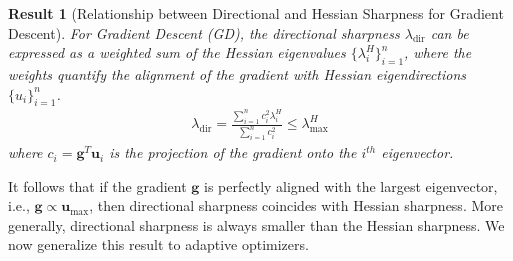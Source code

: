 \documentclass[]{fairmeta}
\theoremstyle{plain}
\newtheorem{result}[theorem]{Result}
\theoremstyle{definition}
\begin{document}
\begin{result}[Relationship between Directional and Hessian Sharpness for Gradient Descent]
\label{prop:dir_hessian_rel_gd}
For Gradient Descent (GD), the directional sharpness $\lambda_{\text{dir}}$ can be expressed as a weighted sum of the Hessian eigenvalues $\{\lambda_i^H\}_{i=1}^n$, where the weights quantify the alignment of the gradient with Hessian eigendirections $\{u_i\}_{i=1}^n$.
\begin{align}
    \lambda_{\text{dir}} = \frac{\sum_{i = 1}^n c_i^2 \lambda_i^H}{\sum_{i = 1}^n c_i^2} \leq \lambda_{\max}^H
\end{align}
where $c_i = \bm{g}^T \bm{u}_i$ is the projection of the gradient onto the $i^{th}$ eigenvector.
\end{result}

It follows that if the gradient $\bm{g}$ is perfectly aligned with the largest eigenvector, i.e., $ \bm{g} \propto \bm{u}_{\max}$, then directional sharpness coincides with Hessian sharpness. More generally, directional sharpness is always smaller than the Hessian sharpness. We now generalize this result to adaptive optimizers.
\end{document}
